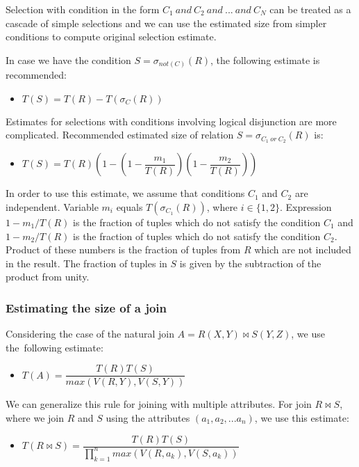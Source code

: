Selection with condition in the form $C_1~and~C_2~and~...~and~C_N$ can be treated as a cascade of simple selections and we can use the estimated size from simpler conditions to compute original selection estimate.

In case we have the condition $S=\sigma_{not(C)}(R)$, the following estimate is recommended:
\begin{itemize}
\item $T(S)=T(R)-T(\sigma_C(R))$
\end{itemize}

Estimates for selections with conditions involving logical disjunction are more complicated. Recommended estimated size of relation $S=\sigma_{C_1~or~C_2}(R)$ is:

\begin{itemize}
\item $T(S)=T(R)(1-(1-\dfrac{m_1}{T(R)})(1-\dfrac{m_2}{T(R)}))$
\end{itemize}

In order to use this estimate, we assume that conditions $C_1$ and $C_2$ are independent.
Variable $m_i$ equals $T(\sigma_{C_1}(R))$, where $i\in\{1,2\}$. Expression $1-m_1/T(R)$ is the fraction of tuples which do not satisfy the condition $C_1$ and $1-m_2/T(R)$ is the fraction of tuples which do not satisfy the  condition $C_2$. Product of these numbers is the fraction of tuples from $R$ which are not included in the result. The fraction of tuples in $S$ is given by the subtraction of the product from unity.

\subsubsection{Estimating the size of a join}
\label{join}
Considering the case of the natural join $A=R(X,Y)\Join S(Y,Z)$, we use the~following estimate:

\begin{itemize}
\item $T(A)=\dfrac{T(R)T(S)}{max(V(R,Y),V(S,Y))}$
\end{itemize}

We can generalize this rule for joining with multiple attributes. For join $R\Join S$, where we join $R$ and $S$ using the attributes $(a_1,a_2,...a_n)$, we use this estimate:

\begin{itemize}
\item $T(R\Join S)=\dfrac{T(R)T(S)}{\prod_{k=1}^{n}{max(V(R,a_k),V(S,a_k))}}$
\end{itemize}

